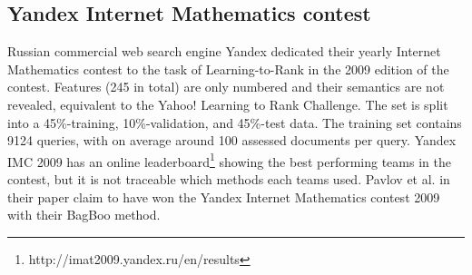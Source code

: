 \subsection{Yandex Internet Mathematics contest}
Russian commercial web search engine Yandex dedicated their yearly Internet Mathematics contest to the task of Learning-to-Rank in the 2009 edition of the contest. Features (245 in total) are only numbered and their semantics are not revealed, equivalent to the Yahoo! Learning to Rank Challenge. The set is split into a 45\%-training, 10\%-validation, and 45\%-test data. The training set contains 9124 queries, with on average around 100 assessed documents per query. Yandex IMC 2009 has an online leaderboard\footnote{http://imat2009.yandex.ru/en/results} showing the best performing teams in the contest, but it is not traceable which methods each teams used. Pavlov et al. \cite{Pavlov2010} in their paper claim to have won the Yandex Internet Mathematics contest 2009 with their BagBoo method.
